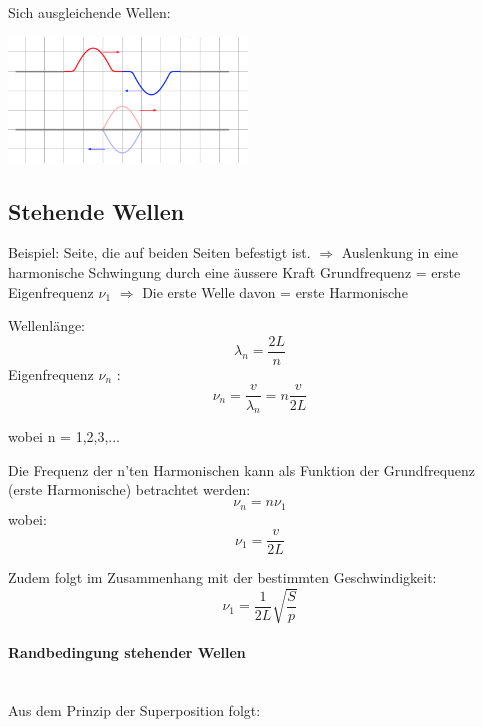 \documentclass[7pt]{article}
\begin{document}
\begin{multicols*}{3}
Sich ausgleichende Wellen:
\begin{center}
	\includegraphics[width=180pt]{images/superposition1.png}
\end{center}

\subsection{Stehende Wellen}
Beispiel: Seite, die auf beiden Seiten befestigt ist. \newline
$\Longrightarrow$ Auslenkung in eine harmonische Schwingung durch eine {\"a}ussere Kraft\newline
\newline
Grundfrequenz = erste Eigenfrequenz $\nu_1$ $\Longrightarrow$ Die erste Welle davon = erste Harmonische \newline

Wellenl{\"a}nge:
\begin{equation*}
\lambda _n = \frac{2L}{n}
\end{equation*}
\newline
Eigenfrequenz $\nu_n$ :
\begin{equation*}
\nu _n = \frac{v}{\lambda _n} = n \frac{v}{2L}
\end{equation*}

wobei n = 1,2,3,... \newline

Die Frequenz der n'ten Harmonischen kann als Funktion der Grundfrequenz (erste Harmonische) betrachtet werden:
\begin{equation*}
\nu _n = n \nu _1
\end{equation*}
wobei:
\begin{equation*}
\nu _1 = \frac{v}{2L} 
\end{equation*}

Zudem folgt im Zusammenhang mit der bestimmten Geschwindigkeit:
\begin{equation*}
\nu _1 = \frac{1}{2L}  \sqrt{\frac{S}{p}}
\end{equation*}

\paragraph{Randbedingung stehender Wellen}\mbox{}\\
Aus dem Prinzip der Superposition folgt:


\end{multicols*}
\end{document}

